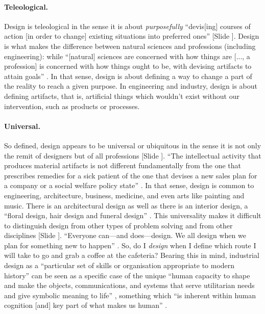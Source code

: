 \documentclass{article}
\newcounter{slide}
\begin{document}
\paragraph{Teleological.} Design is teleological in the sense it is about \emph{purposefully} ``devis[ing] courses of action [in order to change] existing situations into preferred ones'' \cite[p. 111]{simon1996sciences} {\color{blue}[Slide ]}. Design is what makes the difference between natural sciences and professions (including engineering): while ``[natural] sciences are concerned with how things are [..., a profession] is concerned with how things ought to be, with devising artifacts to attain goals'' \cite[p. 114]{simon1996sciences}. In that sense, design is about defining a way to change a part of the reality to reach a given purpose. In engineering and industry, design is about defining artifacts, that is, artificial things which wouldn't exist without our intervention, such as products or processes. 

\paragraph{Universal.} So defined, design appears to be universal or ubiquitous in the sense it is not only the remit of designers but of all professions {\color{blue}[Slide ]}. ``The intellectual activity that produces material artifacts is not different fundamentally from the one that prescribes remedies for a sick patient of the one that devises a new sales plan for a company or a social welfare policy state'' \cite[p. 111]{simon1996sciences}. In that sense, design is common to engineering, architecture, business, medicine, and even arts like painting and music. There is an architectural design as well as there is an interior design, a ``floral design, hair design and funeral design'' \cite{heskett2001past}. This universality makes it difficult to distinguish design from other types of problem solving \cite{hatchuel2003new} and from other disciplines {\color{blue}[Slide ]}. ``Everyone can---and does---design. We all design when we plan for something new to happen'' \cite{cross2011design}. So, do I \emph{design} when I define which route I will take to go and grab a coffee at the cafeteria? Bearing this in mind, industrial design as a ``particular set of skills or organisation appropriate to modern history'' can be seen as a specific case of the unique ``human capacity to shape and make the objects, communications, and systems that serve utilitarian needs and give symbolic meaning to life'' \cite{heskett2001past}, something which ``is inherent within human cognition [and] key part of what makes us human'' \cite{cross2011design}.
\end{document}
